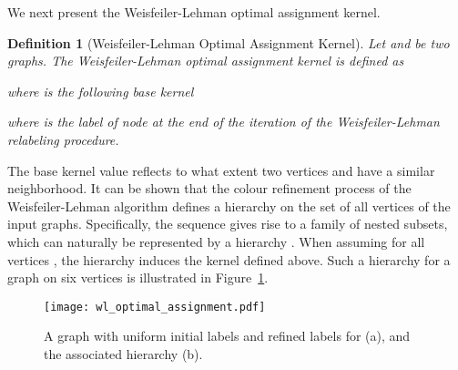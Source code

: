 \documentclass[twoside,11pt]{article}
\newtheorem{definition}{Definition}
\begin{document}
We next present the Weisfeiler-Lehman optimal assignment kernel.
\begin{definition}[Weisfeiler-Lehman Optimal Assignment Kernel]
  Let  and  be two graphs.
  The Weisfeiler-Lehman optimal assignment kernel is defined as
  
  where  is the following base kernel
  
  where  is the label of node  at the end of the  iteration of the Weisfeiler-Lehman relabeling procedure.
\end{definition}
The base kernel value reflects to what extent two vertices  and  have a similar neighborhood.
It can be shown that the colour refinement process of the Weisfeiler-Lehman algorithm defines a hierarchy on the set of all vertices of the input graphs.
Specifically, the sequence  gives rise to a family of nested subsets, which can naturally be represented by a hierarchy .
When assuming  for all vertices , the hierarchy induces the kernel defined above.
Such a hierarchy for a graph on six vertices is illustrated in Figure~\ref{fig:wl_optimal_assignment}.
\begin{figure}[t]
  \centering
  \texttt{[image: wl\_optimal\_assignment.pdf]}
    \caption{A graph  with uniform initial labels  and refined labels  for  (a), and the associated hierarchy (b).}
    \label{fig:wl_optimal_assignment}
\end{figure}
\end{document}
